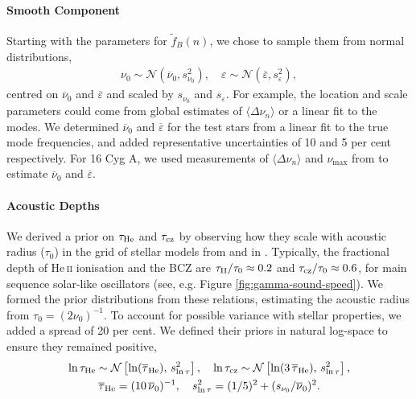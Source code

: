 \paragraph{Smooth Component} Starting with the parameters for \(\tilde{f}_B(n)\), we chose to sample them from normal distributions,
%
\begin{gather}
    \nu_0 \sim \mathcal{N}(\overline{\nu}_0, s_{\nu_0}^2), \quad \varepsilon \sim \mathcal{N}(\overline{\varepsilon}, s_\varepsilon^2),%
\end{gather}
%
centred on \(\overline{\nu}_0\) and \(\overline{\varepsilon}\) and scaled by \(s_{\nu_0}\) and \(s_\varepsilon\). For example, the location and scale parameters could come from global estimates of \(\langle\Delta\nu_n\rangle\) or a linear fit to the modes. We determined \(\overline{\nu}_0\) and \(\overline{\varepsilon}\) for the test stars from a linear fit to the true mode frequencies, and added representative uncertainties of 10 and 5 per cent respectively. For 16 Cyg A, we used measurements of \(\langle\Delta\nu_n\rangle\) and \(\nu_{\max}\) from \citet{Lund.SilvaAguirre.ea2017} to estimate \(\overline{\nu}_0\) and \(\overline{\varepsilon}\).


\paragraph{Acoustic Depths} We derived a prior on \(\tau_{{\mathrm{He}}}\) and \(\tau_{{\mathrm{cz}}}\) by observing how they scale with acoustic radius (\(\tau_0\)) in the grid of stellar models from \citet{Lyttle.Davies.ea2021} and in \citet{Verma.Rorsted.ea2022}. Typically, the fractional depth of He\,\textsc{ii} ionisation and the BCZ are \(\tau_{{\mathrm{II}}}/\tau_0 \approx 0.2\) and \(\tau_{{\mathrm{cz}}}/\tau_0 \approx 0.6\), for main sequence solar-like oscillators (see, e.g. Figure \ref{fig:gamma-sound-speed}). We formed the prior distributions from these relations, estimating the acoustic radius from \({\tau}_0 = (2\nu_0)^{-1}\). To account for possible variance with stellar properties, we added a spread of 20 per cent. We defined their priors in natural log-space to ensure they remained positive,
%
\begin{gather}
    \ln\tau_{{\mathrm{He}}} \sim \mathcal{N}\left[ \ln(\overline{\tau}_{{\mathrm{He}}}), \, s_{\ln\tau}^2 \right], \quad \ln\tau_{{\mathrm{cz}}} \sim \mathcal{N}\left[\ln(3\,\overline{\tau}_{{\mathrm{He}}}), \, s_{\ln\tau}^2 \right],\\
    \overline{\tau}_{{\mathrm{He}}} = (10\,\overline{\nu}_0)^{-1}, \quad s_{\ln\tau}^2 = (1/5)^2 + (s_{\nu_0}/\overline{\nu}_0)^2.
\end{gather}


